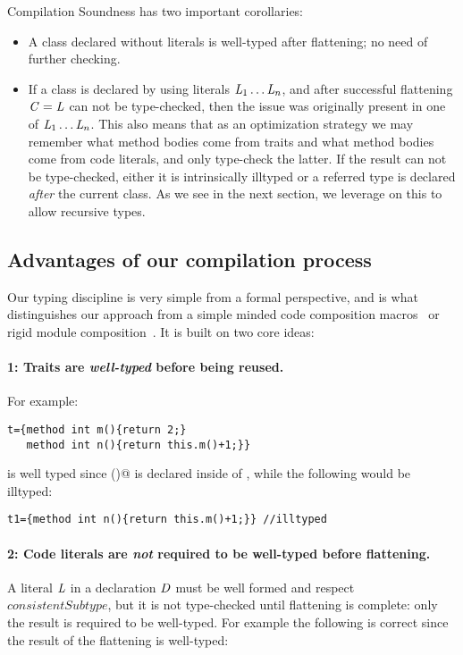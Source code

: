 \noindent Compilation Soundness has two important corollaries:
\begin{itemize}
\item A class declared without literals
is well-typed after flattening; no need of further checking.
\item If a class is declared by using literals $\mathit{L}_1\ldots\mathit{L}_n$, and after successful flattening $\mathit{C} = \mathit{L}$ can not be type-checked,
then the issue was originally present in one of $\mathit{L}_1\ldots\mathit{L}_n$.
This also means that as an optimization strategy
 we may remember what method bodies come from traits and what method bodies come from code literals, and only type-check the latter.
If the result can not be type-checked, either it is intrinsically illtyped or a 
referred type is declared \emph{after} the current class. 
As we see in the next section, we leverage on this 
to allow recursive types.
 \end{itemize}






\subsection{Advantages of our compilation process}


Our typing discipline is very simple from a formal perspective,  
and is what distinguishes our approach from a simple minded code composition macros~\cite{bawden1999quasiquotation}
or rigid module composition~\cite{ancona2002calculus}. 
It is built on two core ideas:

\paragraph{1: Traits are \emph{well-typed} before being reused.}
 For example:

\begin{lstlisting}
t={method int m(){return 2;} 
   method int n(){return this.m()+1;}}
\end{lstlisting}

\noindent \Q@t@ is well typed since \Q@m()@ is declared inside of \Q@t@, while the following would be illtyped:

\begin{lstlisting}
t1={method int n(){return this.m()+1;}} //illtyped
\end{lstlisting}


\paragraph{2: Code literals are \emph{not} required to be well-typed before flattening.}
A literal $\mathit{L}$ in a declaration $\mathit{D}$
must be well formed and respect
$\mathit{consistentSubtype}$, but
it is not type-checked until flattening is complete:
only the result is required to be well-typed.
For example the following is correct since
the result of the flattening is well-typed:

